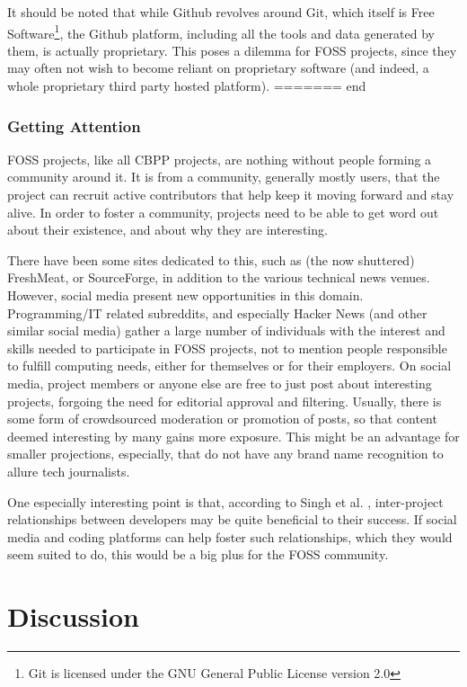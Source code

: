 \documentclass[a4paper,11pt]{article} %
\begin{document}
It should be noted that while Github revolves around Git, which itself
is Free Software\footnote{Git is licensed under the GNU General Public
  License version 2.0}, the Github platform, including all the tools
and data generated by them, is actually proprietary. This poses a
dilemma for FOSS projects, since they may often not wish to become
reliant on proprietary software (and indeed, a whole proprietary third
party hosted platform).
======= end


\subsubsection{Getting Attention}
FOSS projects, like all CBPP projects, are nothing without people forming a
community around it. It is from a community, generally mostly users, that
the project can recruit active contributors that help keep it moving forward
and stay alive. In order to foster a community, projects need to be able to
get word out about their existence, and about why they are interesting.

There have been some sites dedicated to this, such as (the now shuttered)
FreshMeat, or SourceForge, in addition to the various technical news
venues. However, social media present new opportunities in this
domain. Programming/IT related subreddits, and especially Hacker News (and
other similar social media) gather a large number of individuals with the
interest and skills needed to participate in FOSS projects, not to mention
people responsible to fulfill computing needs, either for themselves or for
their employers.  On social media, project members or anyone else are free
to just post about interesting projects, forgoing the need for editorial
approval and filtering. Usually, there is some form of crowdsourced
moderation or promotion of posts, so that content deemed interesting by many
gains more exposure. This might be an advantage for smaller projections,
especially, that do not have any brand name recognition to allure tech
journalists.

One especially interesting point is that, according to Singh et
al. \cite{singh2011network}, inter-project relationships between developers
may be quite beneficial to their success. If social media and coding
platforms can help foster such relationships, which they would seem suited
to do, this would be a big plus for the FOSS community.

\section{Discussion}
\end{document}

